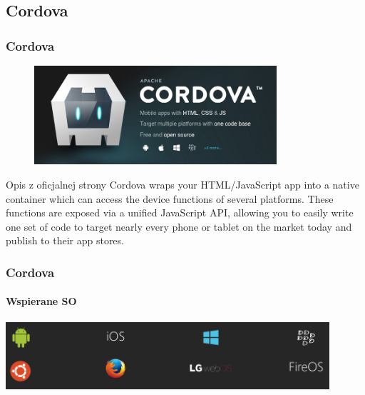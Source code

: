 \documentclass{beamer}
\begin{document}
\subsection{Cordova}

\begin{frame}
\frametitle{Cordova}

\begin{figure}
 \includegraphics[width=9cm,valign=t]{cordova.png}
 \end{figure}
 \begin{block}{Opis z oficjalnej strony }
Cordova wraps your HTML/JavaScript app into a native container which can access the device functions of several platforms. These functions are exposed via a unified JavaScript API, allowing you to easily write one set of code to target nearly every phone or tablet on the market today and publish to their app stores. 
 \end{block}
\end{frame}
\begin{frame}
\frametitle{Cordova}
\framesubtitle{Wspierane SO}
\includegraphics[width=12cm,valign=t]{sup_plat1.png}


\end{frame}
\end{document}
